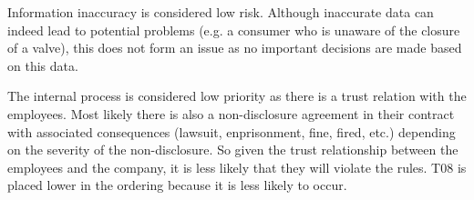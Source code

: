 \npar Information inaccuracy is considered low risk. Although inaccurate data
can indeed lead to potential problems (e.g. a consumer who is unaware of the
closure of a valve), this does not form an issue as no important decisions are
made based on this data.

\npar The internal process is considered low priority as there is a trust
relation with the employees. Most likely there is also a non-disclosure
agreement in their contract with associated consequences (lawsuit, enprisonment,
fine, fired, etc.) depending on the severity of the non-disclosure. So given the
trust relationship between the employees and the company, it is less likely that
they will violate the rules. T08 is placed lower in the ordering because it is
less likely to occur.
